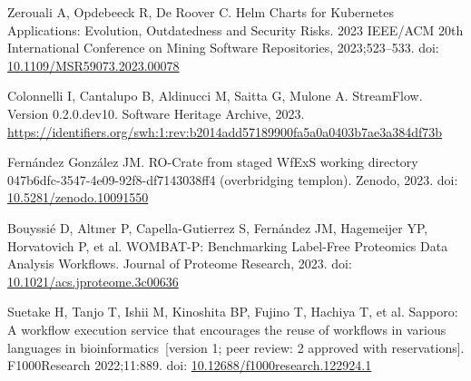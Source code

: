 \documentclass[10pt,letterpaper]{article}
\begin{document}
\begin{thebibliography}{10}
\begin{small}
Zerouali A, Opdebeeck R, De Roover C.
Helm Charts for Kubernetes Applications: Evolution, Outdatedness and Security Risks.
2023 IEEE/ACM 20th International Conference on Mining Software Repositories, 2023;523--533.
doi: \href{https://doi.org/10.1109/MSR59073.2023.00078}{10.1109/MSR59073.2023.00078}

Colonnelli I, Cantalupo B, Aldinucci M, Saitta G, Mulone A.
StreamFlow. Version 0.2.0.dev10.
Software Heritage Archive, 2023.
\url{https://identifiers.org/swh:1:rev:b2014add57189900fa5a0a0403b7ae3a384df73b}

Fernández González JM.
RO-Crate from staged WfExS working directory 047b6dfc-3547-4e09-92f8-df7143038ff4 (overbridging templon).
Zenodo, 2023.
doi: \href{https://doi.org/10.5281/zenodo.10091550}{10.5281/zenodo.10091550}


Bouyssié D, Altıner P, Capella-Gutierrez S, Fernández JM, Hagemeijer YP, Horvatovich P, et al.
WOMBAT-P: Benchmarking Label-Free Proteomics Data Analysis Workflows.
Journal of Proteome Research, 2023.
doi: \href{https://doi.org/10.1021/acs.jproteome.3c00636}{10.1021/acs.jproteome.3c00636}

Suetake H, Tanjo T, Ishii M, Kinoshita BP, Fujino T, Hachiya T, et al.
Sapporo: A workflow execution service that encourages the reuse of workflows in various languages in bioinformatics~[version 1; peer review: 2 approved with reservations].
F1000Research 2022;11:889.
doi: \href{https://doi.org/10.12688/f1000research.122924.1}{10.12688/f1000research.122924.1}



\end{small}
\end{thebibliography}
\end{document}
